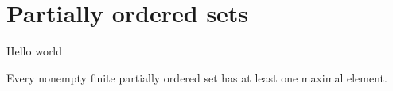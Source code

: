 \section{Partially ordered sets} \label{sec:appendix-poset}
 Hello world


 \begin{lemma}\label{lem:nonempty-finite-posets-have-maximal-elements}
   Every nonempty finite partially ordered set has at least one maximal element. 
 \end{lemma}
